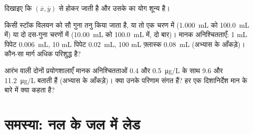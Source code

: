 \begin{exercise}[$\star\star\star$]\label{exo:b2:measurement-statistics:10}
दिखाइए कि  $(\bar x, \bar y)$ से होकर जाती है और उसके  का योग शून्य है।
\end{exercise}

\begin{exercise}[$\star\star\star$]\label{exo:b2:measurement-statistics:11}
किसी स्टॉक विलयन को सौ गुना तनु किया जाता है, या तो एक चरण में (\qty{1.000}{mL} को \qty{100.0}{mL} में) या
दो दस-गुना चरणों में (\qty{10.00}{mL} को \qty{100.0}{mL} में, दो बार)। मानक अनिश्चितताएँ: 1 mL
पिपेट \qty{0.006}{mL}, 10 mL पिपेट \qty{0.02}{mL}, 100 mL फ़्लास्क \qty{0.08}{mL} (अभ्यास के आँकड़े)।
कौन-सा मार्ग अधिक परिशुद्ध है?
\end{exercise}

\begin{exercise}[$\star\star\star$]\label{exo:b2:measurement-statistics:12}
आरंभ वाली दोनों प्रयोगशालाएँ मानक अनिश्चितताओं 0.4 और \qty{0.5}{\micro g/L} के साथ 9.6 और \qty{11.2}{\micro g/L} बताती हैं
(अभ्यास के आँकड़े)। क्या उनके परिणाम संगत हैं? हर एक दिशानिर्देश मान के बारे में क्या कहता है?
\end{exercise}

\section{समस्या: नल के जल में लेड}

